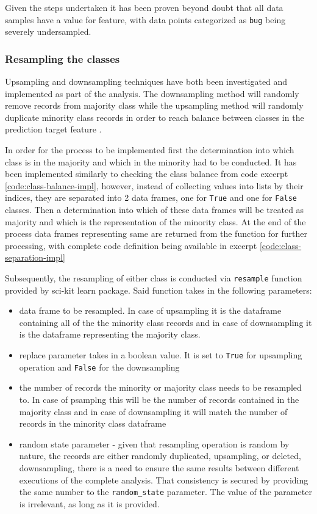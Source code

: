 Given the steps undertaken it has been proven beyond doubt that all data samples have a value for \isBug{} feature, with data points categorized as \texttt{bug} being severely undersampled.

\subsubsection{Resampling the classes}\label{sec:impl-data-analysis:resampling}
Upsampling and downsampling techniques have both been investigated and implemented as part of the analysis. The downsampling method will randomly remove records from majority class while the upsampling method will randomly duplicate minority class records in order to reach balance between classes in the prediction target feature \isBug{}. 

In order for the process to be implemented first the determination into which class is in the majority and which in the minority had to be conducted. It has been implemented similarly to checking the class balance from code excerpt \ref{code:class-balance-impl}, however, instead of collecting values into lists by their indices, they are separated into 2 data frames, one for \texttt{True} and one for \texttt{False} classes. Then a determination into which of these data frames will be treated as majority and which is the representation of the minority class. At the end of the process data frames representing same are returned from the function for further processing, with complete code definition being available in excerpt \ref{code:class-separation-impl}

Subsequently, the resampling of either class is conducted via \texttt{resample} function provided by sci-kit learn package. Said function takes in the following parameters:
\begin{itemize}
    \item data frame to be resampled. In case of upsampling it is the dataframe containing all of the the minority class records and in case of downsampling it is the dataframe representing the majority class.
    \item replace parameter takes in a boolean value. It is set to \texttt{True} for upsampling operation and \texttt{False} for the downsampling
    \item the number of records the minority or majority class needs to be resampled to. In case of psamplng this will be the number of records contained in the majority class and in case of downsampling it will match the number of records in the minority class dataframe
    \item random state parameter - given that resampling operation is random by nature, the records are either randomly duplicated, upsampling, or deleted, downsampling, there is a need to ensure the same results between different executions of the complete analysis. That consistency is secured by providing the same number to the \texttt{random\_state} parameter. The value of the parameter is irrelevant, as long as it is provided.
\end{itemize}

